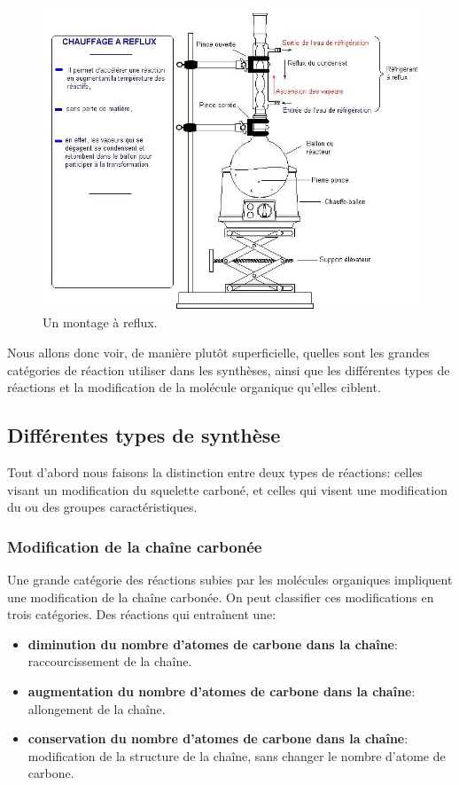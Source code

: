 \documentclass[11pt,a4paper]{article}
\begin{document}
\begin{figure}[h]
    \centering
    \includegraphics[width=\linewidth]{imgs/c5/reflux2.jpg}
    \caption{Un montage à reflux.}
    \label{fig:reflux}
\end{figure}

Nous allons donc voir, de manière plutôt superficielle, quelles sont les grandes catégories de réaction utiliser dans les synthèses, ainsi que les différentes types de réactions et la modification de la molécule organique qu'elles ciblent. 

\subsection{Différentes types de synthèse}
Tout d'abord nous faisons la distinction entre deux types de réactions: celles visant un modification du squelette carboné, et celles qui visent une modification du ou des groupes caractéristiques. 

\subsubsection{Modification de la chaîne carbonée}

Une grande catégorie des réactions subies par les molécules organiques impliquent une modification de la chaîne carbonée. On peut classifier ces modifications en trois catégories. Des réactions qui entraînent une: 
\begin{itemize}
    \item \textbf{diminution du nombre d’atomes de carbone dans la chaîne}: raccourcissement de la chaîne. 
    \item \textbf{augmentation du nombre d’atomes de carbone dans la chaîne}: allongement de la chaîne.
    \item \textbf{conservation du nombre d’atomes de carbone dans la chaîne}: modification de la structure de la chaîne, sans changer le nombre d'atome de carbone. 
\end{itemize}
\end{document}
